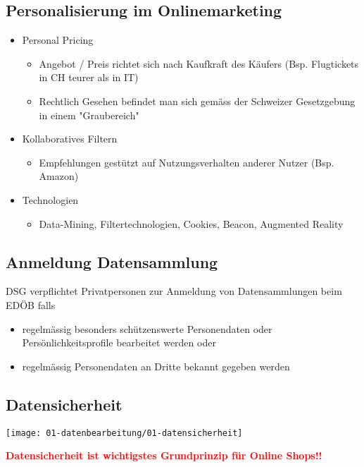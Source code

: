 \subsection{Personalisierung im Onlinemarketing}
\begin{itemize}
    \item Personal Pricing
    \begin{itemize}
        \item Angebot / Preis richtet sich nach Kaufkraft des Käufers (Bsp. Flugtickets in CH teurer als in IT)
        \item Rechtlich Gesehen befindet man sich gemäss der Schweizer Gesetzgebung in einem "Graubereich"
    \end{itemize}
    \item Kollaboratives Filtern
    \begin{itemize}
        \item Empfehlungen gestützt auf Nutzungsverhalten anderer Nutzer (Bsp. Amazon)
    \end{itemize}
    \item Technologien
    \begin{itemize}
        \item Data-Mining, Filtertechnologien, Cookies, Beacon, Augmented Reality
    \end{itemize}
\end{itemize}

\subsection{Anmeldung Datensammlung}
DSG verpflichtet Privatpersonen zur Anmeldung von Datensammlungen beim EDÖB falls
\begin{itemize}
    \item regelmässig besonders schützenswerte Personendaten oder Persönlichkeitsprofile bearbeitet werden oder
    \item regelmässig Personendaten an Dritte bekannt gegeben werden
\end{itemize}

\subsection{Datensicherheit}
\begin{center}
    \texttt{[image: 01-datenbearbeitung/01-datensicherheit]}
\end{center}
\textcolor{red}{\textbf{Datensicherheit ist wichtigstes Grundprinzip für Online Shops!!}}

